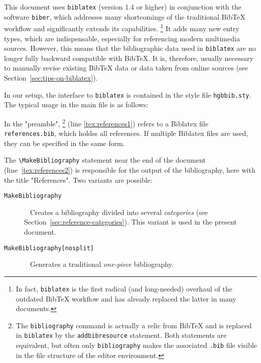 This document uses \texttt{biblatex} (version 1.4 or higher) in conjunction with
the software \texttt{biber}, which addresses many shortcomings of the
traditional BibTeX workflow and significantly extends its capabilities.%
\footnote{In fact, \texttt{biblatex} is the first radical (and long-needed)
overhaul of the outdated BibTeX workflow and has already replaced the latter in
many documents.}
It adds many new entry types, which are indispensable, especially for
referencing modern multimedia sources. However, this means that the
bibliographic data used in \texttt{biblatex} are no longer fully backward
compatible with BibTeX. It is, therefore, usually necessary to manually revise
existing BibTeX data or data taken from online sources (see
Section~\ref{sec:tips-on-biblatex}).

In our setup, the interface to \texttt{biblatex} is contained in the style
file \nolinkurl{hgbbib.sty}. The typical usage in the main \latex file is as
follows:
%
%
In the "preamble",
\verb!!%
\footnote{The \texttt{{\bs}bibliography} command is actually a relic from BibTeX
and is replaced in \texttt{biblatex} by the \texttt{{\bs}addbibresource}
statement. Both statements are equivalent, but often only
\texttt{{\bs}bibliography} makes the associated \texttt{.bib} file visible in
the file structure of the editor environment.}
(line \ref{tex:references1}) refers to a Biblatex file \nolinkurl{references.bib},
which holdss all references.
If multiple Biblatex files are used, they can be specified in the same form.

The \verb!\MakeBibliography! statement near the end of the document
(line~\ref{tex:references2}) is responsible for the output of the bibliography,
here with the title "References". Two variants are possible:
%
\begin{description}
    \item[\texttt{{\bs}MakeBibliography}] ~ \newline
    Creates a bibliography divided into several \emph{categories} (see
    Section~\ref{sec:reference-categories}). This variant is used in the present
    document.
%
    \item[\texttt{{\bs}MakeBibliography[nosplit]}] ~ \newline
    Generates a traditional \emph{one-piece} bibliography.
\end{description}

